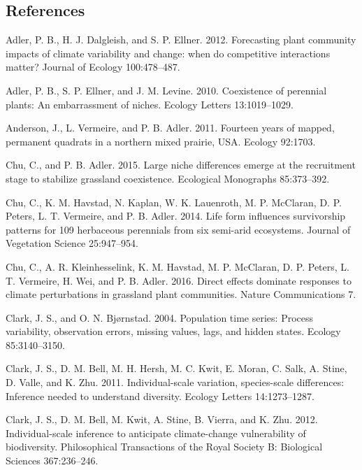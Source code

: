 \documentclass[12pt,]{article}
\begin{document}
\newpage{}

\singlespace{}

\subsection*{References}\label{references}

\hypertarget{refs}{}
\hypertarget{ref-Adler2012}{}
Adler, P. B., H. J. Dalgleish, and S. P. Ellner. 2012. Forecasting plant
community impacts of climate variability and change: when do competitive
interactions matter? Journal of Ecology 100:478--487.

\hypertarget{ref-Adler2010}{}
Adler, P. B., S. P. Ellner, and J. M. Levine. 2010. Coexistence of
perennial plants: An embarrassment of niches. Ecology Letters
13:1019--1029.

\hypertarget{ref-Anderson2011}{}
Anderson, J., L. Vermeire, and P. B. Adler. 2011. Fourteen years of
mapped, permanent quadrats in a northern mixed prairie, USA. Ecology
92:1703.

\hypertarget{ref-Chu2015}{}
Chu, C., and P. B. Adler. 2015. Large niche differences emerge at the
recruitment stage to stabilize grassland coexistence. Ecological
Monographs 85:373--392.

\hypertarget{ref-Chu2014a}{}
Chu, C., K. M. Havstad, N. Kaplan, W. K. Lauenroth, M. P. McClaran, D.
P. Peters, L. T. Vermeire, and P. B. Adler. 2014. Life form influences
survivorship patterns for 109 herbaceous perennials from six semi-arid
ecosystems. Journal of Vegetation Science 25:947--954.

\hypertarget{ref-Chu2016}{}
Chu, C., A. R. Kleinhesselink, K. M. Havstad, M. P. McClaran, D. P.
Peters, L. T. Vermeire, H. Wei, and P. B. Adler. 2016. Direct effects
dominate responses to climate perturbations in grassland plant
communities. Nature Communications 7.

\hypertarget{ref-Clark2004}{}
Clark, J. S., and O. N. Bjørnstad. 2004. Population time series: Process
variability, observation errors, missing values, lags, and hidden
states. Ecology 85:3140--3150.

\hypertarget{ref-Clark2011b}{}
Clark, J. S., D. M. Bell, M. H. Hersh, M. C. Kwit, E. Moran, C. Salk, A.
Stine, D. Valle, and K. Zhu. 2011. Individual-scale variation,
species-scale differences: Inference needed to understand diversity.
Ecology Letters 14:1273--1287.

\hypertarget{ref-Clark2012}{}
Clark, J. S., D. M. Bell, M. Kwit, A. Stine, B. Vierra, and K. Zhu.
2012. Individual-scale inference to anticipate climate-change
vulnerability of biodiversity. Philosophical Transactions of the Royal
Society B: Biological Sciences 367:236--246.
\end{document}
